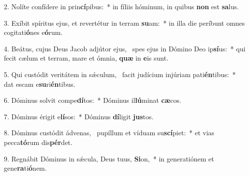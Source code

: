 2. Nolíte confídere in prin\textbf{cí}pibus:~*  in fíliis hóminum, in quibus \textbf{non} est \textbf{sa}lus.\

3. Exíbit spíritus ejus, et revertétur in terram \textbf{su}am:~*  in illa die períbunt omnes cogitati\textbf{ó}nes e\textbf{ó}rum.\

4. Beátus, cujus Deus Jacob adjútor ejus, \dag\  spes ejus in Dómino Deo ip\textbf{sí}us:~*  qui fecit cælum et terram, mare et ómnia, \textbf{quæ} in \textbf{e}is sunt.\

5. Qui custódit veritátem in sǽculum, \dag\  facit judícium injúriam pati\textbf{én}tibus:~*  dat escam e\textbf{su}ri\textbf{én}tibus.\

6. Dóminus solvit compe\textbf{dí}tos:~*  Dóminus il\textbf{lú}minat \textbf{cæ}cos.\

7. Dóminus érigit e\textbf{lí}sos:~*  Dóminus \textbf{dí}ligit \textbf{jus}tos.\

8. Dóminus custódit ádvenas, \dag\  pupíllum et víduam su\textbf{scí}piet:~*  et vias pecca\textbf{tó}rum dis\textbf{pér}det.\

9. Regnábit Dóminus in sǽcula, Deus tuus, \textbf{Si}on,~*  in generatiónem et gene\textbf{ra}ti\textbf{ó}nem.\

